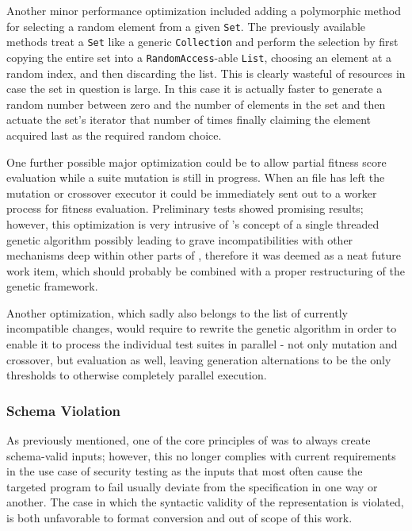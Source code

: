 Another minor performance optimization included adding a polymorphic method for selecting a random 
element from a given \texttt{Set}. The previously available methods treat a \texttt{Set} like a 
generic \texttt{Collection} and perform the selection by first copying the entire set into a 
\texttt{RandomAccess}-able \texttt{List}, choosing an element at a random index, and then discarding the list.
This is clearly wasteful of resources in case the set in question is large. In this case it is actually faster
to generate a random number between zero and the number of elements in the set and then actuate the set's
iterator that number of times finally claiming the element acquired last as the required random choice.

One further possible major optimization could be to allow partial fitness score evaluation while a suite 
mutation is still in progress. When an \xml file has left the mutation or crossover executor it could be 
immediately sent out to a worker process for fitness evaluation. Preliminary tests showed promising 
results; however, this optimization is very intrusive of \evosuite's concept of a single threaded 
genetic algorithm possibly leading to grave incompatibilities with other mechanisms deep within other parts 
of \evosuite, therefore it was deemed as a neat future work item, which should probably be combined with a 
proper restructuring of the genetic framework.

Another optimization, which sadly also belongs to the list of currently incompatible changes, would require to
rewrite the genetic algorithm in order to enable it to process the individual test suites in parallel -
not only mutation and crossover, but evaluation as well, leaving generation alternations to be the only
thresholds to otherwise completely parallel execution.
\subsubsection{Schema Violation}
\label{sec:local}
As previously mentioned, one of the core principles of \xmlmate was to always create schema-valid inputs; 
however, this no longer complies with current requirements in the use case of security testing as the 
inputs that most often cause the targeted program to fail usually deviate from the specification in 
one way or another. The case in which the syntactic validity of the \xml representation is violated, is 
both unfavorable to format conversion and out of scope of this work.

